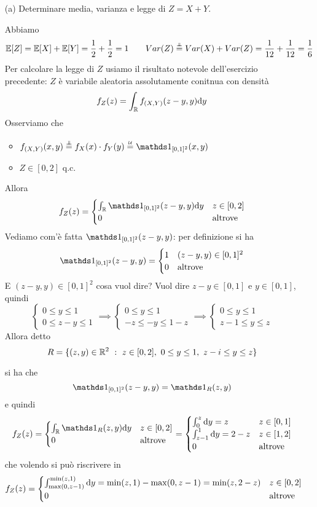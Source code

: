 \Soluzione{}
\begin{enumerate}
\item [(a)] Determinare media, varianza e legge di $Z=X+Y$.

Abbiamo
\[
\EE[Z]=\EE[X]+\EE[Y]=\frac{1}{2}+\frac{1}{2}=1\qquad Var(Z)\overset{\underset{\indep}{}}{=}Var(X)+Var(Z)=\frac{1}{12}+\frac{1}{12}=\frac{1}{6}
\]
Per calcolare la legge di $Z$ usiamo il risultato notevole dell'esercizio precedente: $Z$ è variabile aleatoria assolutamente conitnua con densità
\[
f_Z(z)=\int_{\mathbb{R}} f_{(X,Y)}(z-y,y)\mathrm{d} y
\]
Osserviamo che
\begin{itemize}
\item $\fXYxy\overset{\underset{\indep}{}}{=}f_X(x)\cdot f_Y(y)\overset{\underset{\UUU}{}}{=}\Ind_{[0,1]^2}(x,y)$
\item $Z\in[0,2]$ q.c.
\end{itemize}
Allora
\[
f_Z(z)=
\begin{cases}
\int_\RR\Ind_{[0,1]^2}(z-y,y)\dy &z\in[0,2] \\
0 &\text{altrove}
\end{cases}
\]
Vediamo com'è fatta $\Ind_{[0,1]^2}(z-y,y)$: per definizione si ha
\[
\Ind_{[0,1]^2}(z-y,y)=
\begin{cases}
1 &(z-y,y)\in[0,1]^2 \\
0 &\text{altrove}
\end{cases}
\]
E $(z-y,y)\in[0,1]^2$ cosa vuol dire? Vuol dire $z-y\in[0,1]$ e $y\in[0,1]$, quindi
\[
\begin{cases}
0\leq y\leq 1 \\
0\leq z-y \leq 1
\end{cases}
\implies
\begin{cases}
0\leq y\leq 1 \\
-z\leq -y \leq 1-z
\end{cases}
\implies
\begin{cases}
0\leq y\leq 1 \\
z-1\leq y \leq z
\end{cases}
\]
Allora detto 
\[
R=\{(z,y)\in\RR^2\ :\ z\in[0,2],\ 0\leq y\leq 1,\ z-i\leq y\leq z  \}
\]


si ha che
\[
\Ind_{[0,1]^2}(z-y,y)=\Ind_R(z,y)
\]
e quindi
\[
f_Z(z)=
\begin{cases}
\int_\RR\Ind_R(z,y)\dy &z\in[0,2] \\
0 &\text{altrove}
\end{cases}
=
\begin{cases}
\int_0^z\dy=z &z\in[0,1] \\
\int_{z-1}^1\dy=2-z  &z\in[1,2] \\
0 &\text{altrove}
\end{cases}
\]
che volendo si può riscrivere in
\[
f_Z(z)=
\begin{cases}
\int_{\max(0,z-1)}^{\min(z,1)}\mathrm{d} y=\min(z,1)-\max(0,z-1)=\min(z,2-z) &z\in[0,2] \\
0 &\text{altrove}
\end{cases}
\]


\end{enumerate}

